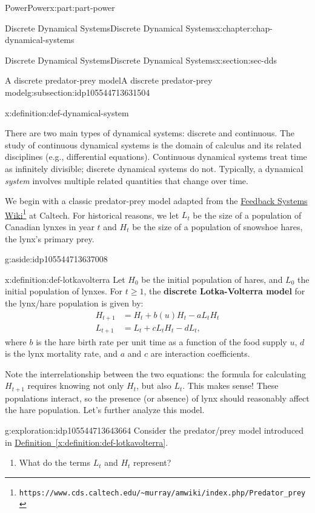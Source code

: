 \documentclass[oneside,10pt,]{book}
\newcommand{\xreffont}{\relax}
\newcommand{\terminology}[1]{\textbf{#1}}
\numberwithin{equation}{section}
\renewcommand{\ge}{\geqslant}
\newcommand{\amp}{&}
\begin{document}
\begin{partptx}{Power}{}{Power}{}{}{x:part:part-power}
\begin{chapterptx}{Discrete Dynamical Systems}{}{Discrete Dynamical Systems}{}{}{x:chapter:chap-dynamical-systems}
\begin{sectionptx}{Discrete Dynamical Systems}{}{Discrete Dynamical Systems}{}{}{x:section:sec-dds}
\begin{subsectionptx}{A discrete predator-prey model}{}{A discrete predator-prey model}{}{}{g:subsection:idp105544713631504}
\begin{definition}{}{x:definition:def-dynamical-system}
\end{definition}
There are two main types of dynamical systems: discrete and continuous. The study of continuous dynamical systems is the domain of calculus and its related disciplines (e.g., differential equations). Continuous dynamical systems treat time as infinitely divisible; discrete dynamical systems do not. Typically, a dynamical \emph{system} involves multiple related quantities that change over time.%
\par
We begin with a classic predator-prey model adapted from the \href{https://www.cds.caltech.edu/\~murray/amwiki/index.php/Predator_prey}{Feedback Systems Wiki}\footnote{\nolinkurl{https://www.cds.caltech.edu/\~murray/amwiki/index.php/Predator_prey}\label{g:fn:idp105544713635472}} at Caltech. For historical reasons, we let \(L_t\) be the size of a population of Canadian lynxes in year \(t\) and \(H_t\) be the size of a population of snowshoe hares, the lynx's primary prey. \begin{aside}{}{g:aside:idp105544713637008}%
\end{aside}
%
\begin{definition}{}{x:definition:def-lotkavolterra}%
Let \(H_0\) be the initial population of hares, and \(L_0\) the initial population of lynxes. For \(t\ge 1\), the \terminology{discrete Lotka-Volterra model} for the lynx\slash{}hare population is given by:%
%
\begin{align*}
H_{t+1} \amp = H_t + b(u) H_t - a L_t H_t\\
L_{t+1} \amp = L_t + c L_t H_t - d L_t,
\end{align*}
where \(b\) is the hare birth rate per unit time as a function of the food supply \(u\), \(d\) is the lynx mortality rate, and \(a\) and \(c\) are interaction coefficients.%
\end{definition}
Note the interrelationship between the two equations: the formula for calculating \(H_{t+1}\) requires knowing not only \(H_t\), but also \(L_t\). This makes sense! These populations interact, so the presence (or absence) of lynx should reasonably affect the hare population. Let's further analyze this model.%
\begin{exploration}{}{g:exploration:idp105544713643664}%
Consider the predator\slash{}prey model introduced in \hyperref[x:definition:def-lotkavolterra]{Definition~{\xreffont\ref{x:definition:def-lotkavolterra}}}.%
%
\begin{enumerate}
\item{}What do the terms \(L_t\) and \(H_t\) represent?%

\end{enumerate}
\end{exploration}
\end{subsectionptx}
\end{sectionptx}
\end{chapterptx}
\end{partptx}
\end{document}

